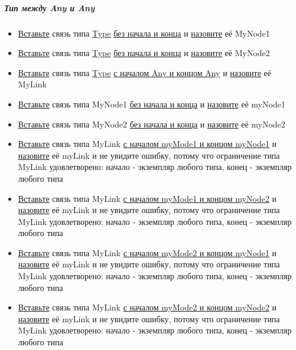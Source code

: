 \documentclass{article}
\begin{document}
\subparagraph{Тип между Any и Any}
\begin{itemize}
  \item \hyperlink{DeepCase.InsertLink.Description}{Вставьте} связь типа
        \hyperlink{Core.Type.Description}{Type} \hyperlink{FAQ.HowToInsertLinkWithoutFromAndTo}{без
          начала и конца} и \hyperlink{FAQ.HowToSetName}{назовите} её MyNode1
  \item \hyperlink{DeepCase.InsertLink.Description}{Вставьте} связь типа
        \hyperlink{Core.Type.Description}{Type} \hyperlink{FAQ.HowToInsertLinkWithoutFromAndTo}{без
          начала и конца} и \hyperlink{FAQ.HowToSetName}{назовите} её MyNode2
  \item \hyperlink{DeepCase.InsertLink.Description}{Вставьте} связь типа
        \hyperlink{Core.Type.Description}{Type} \hyperlink{FAQ.HowToInsertLinkWithFromAndTo}{с
          началом Any и концом Any} и \hyperlink{FAQ.HowToSetName}{назовите} её MyLink
  \item \hyperlink{DeepCase.InsertLink.Description}{Вставьте} связь типа MyNode1
        \hyperlink{FAQ.HowToInsertLinkWithoutFromAndTo}{без начала и конца} и
        \hyperlink{FAQ.HowToSetName}{назовите} её myNode1
  \item \hyperlink{DeepCase.InsertLink.Description}{Вставьте} связь типа MyNode2
        \hyperlink{FAQ.HowToInsertLinkWithoutFromAndTo}{без начала и конца} и
        \hyperlink{FAQ.HowToSetName}{назовите} её myNode2
  \item \hyperlink{DeepCase.InsertLink.Description}{Вставьте} связь типа MyLink
        \hyperlink{FAQ.HowToInsertLinkWithFromAndTo}{с началом myMode1 и концом
          myNode1} и \hyperlink{FAQ.HowToSetName}{назовите} её myLink и не увидите
        ошибку, потому что ограничение типа MyLink удовлетворено: начало - экземпляр
        любого типа, конец - экземпляр любого типа
  \item \hyperlink{DeepCase.InsertLink.Description}{Вставьте} связь типа MyLink
        \hyperlink{FAQ.HowToInsertLinkWithFromAndTo}{с началом myMode1 и концом
          myNode2} и \hyperlink{FAQ.HowToSetName}{назовите} её myLink и не увидите
        ошибку, потому что ограничение типа MyLink удовлетворено: начало - экземпляр
        любого типа, конец - экземпляр любого типа
  \item \hyperlink{DeepCase.InsertLink.Description}{Вставьте} связь типа MyLink
        \hyperlink{FAQ.HowToInsertLinkWithFromAndTo}{с началом myMode2 и концом
          myNode1} и \hyperlink{FAQ.HowToSetName}{назовите} её myLink и не увидите
        ошибку, потому что ограничение типа MyLink удовлетворено: начало - экземпляр
        любого типа, конец - экземпляр любого типа
  \item \hyperlink{DeepCase.InsertLink.Description}{Вставьте} связь типа MyLink
        \hyperlink{FAQ.HowToInsertLinkWithFromAndTo}{с началом myMode2 и концом
          myNode2} и \hyperlink{FAQ.HowToSetName}{назовите} её myLink и не увидите
        ошибку, потому что ограничение типа MyLink удовлетворено: начало - экземпляр
        любого типа, конец - экземпляр любого типа
\end{itemize}
\end{document}

